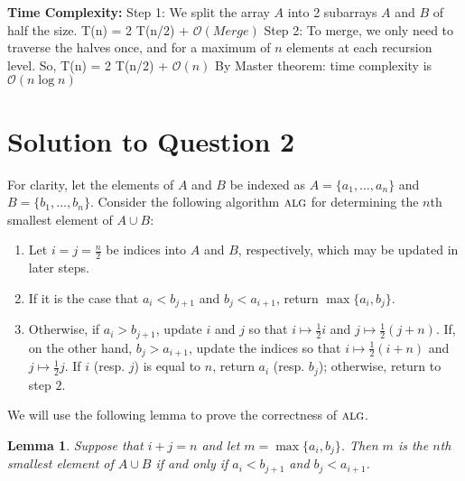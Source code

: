\documentclass[11pt]{article}
\renewcommand{\O}{\mathcal{O}}
\newcommand{\alg}{\textsc{alg}}
\newtheorem{lemma}[theorem]{Lemma}
\begin{document}
{\bf Time Complexity:}\newline
Step 1: We split the array $A$ into 2 subarrays $A$ and $B$ of half the size.
T(n) = 2 T(n/2) + $\O(Merge)$ \newline
Step 2: To merge, we only need to traverse the halves once, and for a maximum of $n$ elements at each recursion level. \newline
So, T(n) = 2 T(n/2) + $\O(n)$ \newline
By Master theorem: time complexity is $\O(n \log n)$ \newline

\section{Solution to Question 2}

For clarity, let the elements of $A$ and $B$ be indexed as $A = \{a_1, \dots, a_n\}$ and $B = \{b_1, \dots, b_n\}$.
Consider the following algorithm $\alg$ for determining the $n$th smallest element of $A \cup B$:
\begin{enumerate}
  \item Let $i = j = \frac{n}{2}$ be indices into $A$ and $B$, respectively, which may be updated in later steps.
  \item If it is the case that $a_i < b_{j+1}$ and $b_j < a_{i+1}$, return $\max \{a_i, b_j\}$.
  \item Otherwise, if $a_i > b_{j+1}$, update $i$ and $j$ so that $i \mapsto \frac{1}{2}i$ and $j \mapsto \frac{1}{2}(j + n)$.
    If, on the other hand, $b_j > a_{i+1}$, update the indices so that $i \mapsto \frac{1}{2}(i + n)$ and $j \mapsto \frac{1}{2}j$.
    If $i$ (resp. $j$) is equal to $n$, return $a_i$ (resp. $b_j$); otherwise, return to step $2$.
\end{enumerate}
We will use the following lemma to prove the correctness of $\alg$.

\begin{lemma}\label{nth-smallest-lemma}
Suppose that $i + j = n$ and let $m = \max \{a_i, b_j\}$. Then $m$ is the $n$th smallest element of $A \cup B$ if and only if $a_i < b_{j+1}$ and $b_j < a_{i+1}$.
\end{lemma}
\end{document}
